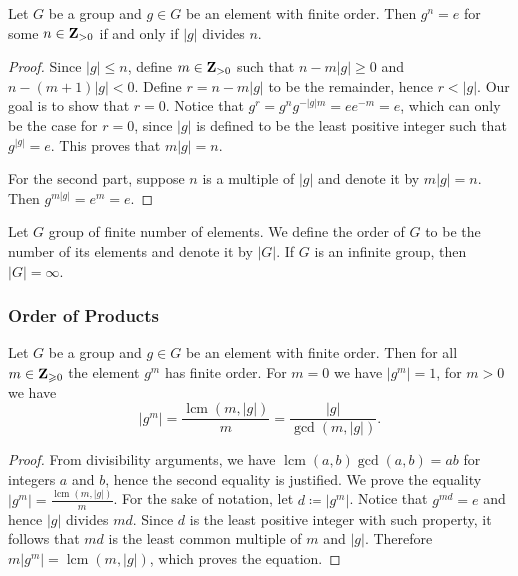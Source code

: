 \begin{lemma}\label{lem: order and multiples}
    Let \(G\) be a group and \(g \in G\) be an element with finite order. Then
    \(g^n = e\) for some \(n \in \mathbf{Z}_{> 0}\) if and only if \(|g|\) divides
    \(n\).
\end{lemma}

\begin{proof}
    Since \(|g| \leq n\), define \(m \in \mathbf{Z}_{> 0}\) such that \(n - m |g|
    \geq 0\) and \(n - (m + 1) |g| < 0\). Define \(r = n - m |g|\) to be the
    remainder, hence \(r < |g|\). Our goal is to show that \(r = 0\). Notice that
    \(g^r = g^n g^{-|g| m} = e e^{-m} = e\), which can only be the case for \(r =
    0\), since \(|g|\) is defined to be the least positive integer such that
    \(g^{|g|} = e\). This proves that \(m |g| = n\).

    For the second part, suppose \(n\) is a multiple of \(|g|\) and denote it by
    \(m|g| = n\). Then \(g^{m |g|} = e^m = e\).
\end{proof}

\begin{definition}
    Let \(G\) group of finite number of elements. We define the order of \(G\) to
    be the number of its elements and denote it by \(|G|\). If \(G\) is an
    infinite group, then \(|G| = \infty\).
\end{definition}

\subsubsection{Order of Products}

\begin{proposition}\label{prop: order of the power}
    Let \(G\) be a group and \(g \in G\) be an element with finite order. Then for
    all \(m \in \mathbf{Z}_{\geqslant 0}\) the element \(g^m\) has finite order. For
    \(m = 0\) we have \(|g^m| = 1\), for \(m > 0\) we have
    \[
        |g^m| = \frac{\operatorname{lcm}(m, |g|)}{m} =
        \frac{|g|}{\operatorname{gcd}(m, |g|)}.
    \]
\end{proposition}

\begin{proof}
    From divisibility arguments, we have \(\operatorname{lcm}(a, b)
    \operatorname{gcd}(a, b) = ab\) for integers \(a\) and \(b\), hence the second
    equality is justified. We prove the equality \(|g^m| =
    \frac{\operatorname{lcm}(m, |g|)} m\). For the sake of notation, let \(d \coloneq
    |g^m|\). Notice that \(g^{m d} = e\) and hence \(|g|\) divides \(m d\). Since
    \(d\) is the least positive integer with such property, it follows that \(m
    d\) is the least common multiple of \(m\) and \(|g|\). Therefore \(m |g^m| =
    \operatorname{lcm}(m, |g|)\), which proves the equation.
\end{proof}


